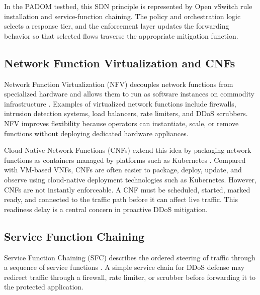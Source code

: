 \documentclass[12pt, a4paper, reqno, oneside]{book}
\newcommand{\padonap}{\textsc{PADOM}}
\begin{document}
In the \padonap{} testbed, this SDN principle is represented by Open vSwitch
rule installation and service-function chaining. The policy and orchestration
logic selects a response tier, and the enforcement layer updates the forwarding
behavior so that selected flows traverse the appropriate mitigation function.

\subsection{Network Function Virtualization and CNFs}
\label{subsec:nfv-cnf-bg}

Network Function Virtualization (NFV) decouples network functions from
specialized hardware and allows them to run as software instances on commodity
infrastructure \cite{etsi_nfv_architecture}. Examples of virtualized network
functions include firewalls, intrusion detection systems, load balancers, rate
limiters, and DDoS scrubbers. NFV improves flexibility because operators can
instantiate, scale, or remove functions without deploying dedicated hardware
appliances.

Cloud-Native Network Functions (CNFs) extend this idea by packaging network
functions as containers managed by platforms such as Kubernetes
\cite{kubernetes_docs}. Compared with VM-based VNFs, CNFs are often easier to
package, deploy, update, and observe using cloud-native deployment technologies
such as Kubernetes. However, CNFs are not instantly enforceable. A CNF must be
scheduled, started, marked ready, and connected to the traffic path before it
can affect live traffic. This readiness delay is a central concern in
proactive DDoS mitigation.

\subsection{Service Function Chaining}
\label{subsec:sfc-bg}

Service Function Chaining (SFC) describes the ordered steering of traffic
through a sequence of service functions \cite{sfc_rfc7665}. A simple service
chain for DDoS defense may redirect traffic through a firewall, rate limiter,
or scrubber before forwarding it to the protected application.

\end{document}
